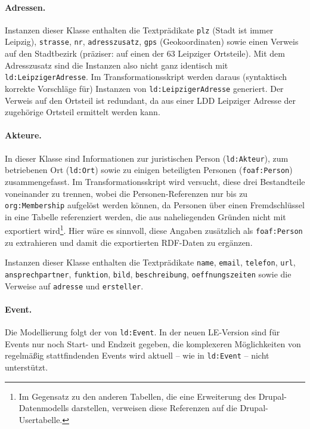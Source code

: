 \documentclass[a4paper,11pt]{article}
\begin{document}
\paragraph{Adressen.}
Instanzen dieser Klasse enthalten die Textprädikate \texttt{plz} (Stadt ist
immer Leipzig), \texttt{strasse}, \texttt{nr}, \texttt{adresszusatz},
\texttt{gps} (Geokoordinaten) sowie einen Verweis auf den Stadtbezirk
(präziser: auf einen der 63 Leipziger Ortsteile).  Mit dem Adresszusatz sind
die Instanzen also nicht ganz identisch mit \texttt{ld:LeipzigerAdresse}. Im
Transformationsskript werden daraus (syntaktisch korrekte Vorschläge für)
Instanzen von \texttt{ld:LeipzigerAdresse} generiert.  Der Verweis auf den
Ortsteil ist redundant, da aus einer LDD Leipziger Adresse der zugehörige
Ortsteil ermittelt werden kann. 

\paragraph{Akteure.}
In dieser Klasse sind Informationen zur juristischen Person
(\texttt{ld:Akteur}), zum betriebenen Ort (\texttt{ld:Ort}) sowie zu einigen
beteiligten Personen (\texttt{foaf:Person}) zusammengefasst.  Im
Transformationsskript wird versucht, diese drei Bestandteile voneinander zu
trennen, wobei die Personen-Referenzen nur bis zu \texttt{org:Membership}
aufgelöst werden können, da Personen über einen Fremdschlüssel in eine Tabelle
referenziert werden, die aus naheliegenden Gründen nicht mit exportiert
wird\footnote{Im Gegensatz zu den anderen Tabellen, die eine Erweiterung des
  Drupal-Datenmodells darstellen, verweisen diese Referenzen auf die
  Drupal-Usertabelle.}. Hier wäre es sinnvoll, diese Angaben zusätzlich als
\texttt{foaf:Person} zu extrahieren und damit die exportierten RDF-Daten zu
ergänzen.

Instanzen dieser Klasse enthalten die Textprädikate \texttt{name},
\texttt{email}, \texttt{telefon}, \texttt{url}, \texttt{ansprech\-partner},
\texttt{funktion}, \texttt{bild}, \texttt{beschreibung},
\texttt{oeffnungszeiten} sowie die Verweise auf \texttt{adresse} und
\texttt{ersteller}.

\paragraph{Event.}
Die Modellierung folgt der von \texttt{ld:Event}. In der neuen LE-Version sind
für Events nur noch Start- und Endzeit gegeben, die komplexeren Möglichkeiten
von regelmäßig stattfindenden Events wird aktuell -- wie in \texttt{ld:Event}
-- nicht unterstützt.
\end{document}
